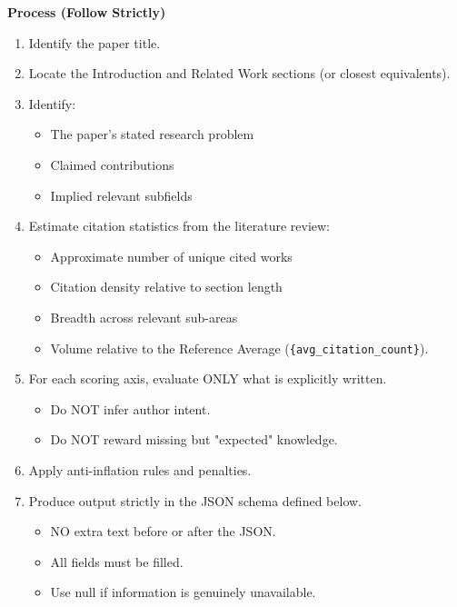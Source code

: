 \vspace{1em}
\noindent\textbf{Process (Follow Strictly)}
\begin{enumerate}
    \item Identify the paper title.
    \item Locate the Introduction and Related Work sections (or closest equivalents).
    \item Identify:
    \begin{itemize}
        \item The paper's stated research problem
        \item Claimed contributions
        \item Implied relevant subfields
    \end{itemize}
    \item Estimate citation statistics from the literature review:
    \begin{itemize}
        \item Approximate number of unique cited works
        \item Citation density relative to section length
        \item Breadth across relevant sub-areas
        \item Volume relative to the Reference Average (\texttt{\{avg\_citation\_count\}}).
    \end{itemize}
    \item For each scoring axis, evaluate ONLY what is explicitly written.
    \begin{itemize}
        \item Do NOT infer author intent.
        \item Do NOT reward missing but "expected" knowledge.
    \end{itemize}
    \item Apply anti-inflation rules and penalties.
    \item Produce output strictly in the JSON schema defined below.
    \begin{itemize}
        \item NO extra text before or after the JSON.
        \item All fields must be filled.
        \item Use null if information is genuinely unavailable.
    \end{itemize}
\end{enumerate}

